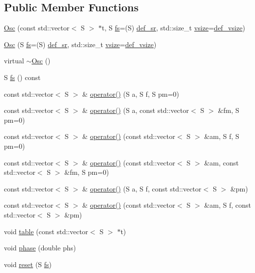 \subsection*{Public Member Functions}
\begin{DoxyCompactItemize}
\item 
\hyperlink{class_aurora_1_1_osc_aa0ff8c343d8e8c0503ed00445d504348}{Osc} (const std\+::vector$<$ S $>$ $\ast$t, S \hyperlink{class_aurora_1_1_osc_a10d968f92bf489112dd990c15cda6780}{fs}=(S) \hyperlink{namespace_aurora_ad49263d809bea98dd422e95bc91bc03e}{def\+\_\+sr}, std\+::size\+\_\+t \hyperlink{class_aurora_1_1_snd_base_af9e21aaf411b17f7a8221c991ce5d291}{vsize}=\hyperlink{namespace_aurora_afaaddf667a06e7ce23c667a8b7295263}{def\+\_\+vsize})
\item 
\hyperlink{class_aurora_1_1_osc_a696356c8638245c8c924adc2bfdc1d0e}{Osc} (S \hyperlink{class_aurora_1_1_osc_a10d968f92bf489112dd990c15cda6780}{fs}=(S) \hyperlink{namespace_aurora_ad49263d809bea98dd422e95bc91bc03e}{def\+\_\+sr}, std\+::size\+\_\+t \hyperlink{class_aurora_1_1_snd_base_af9e21aaf411b17f7a8221c991ce5d291}{vsize}=\hyperlink{namespace_aurora_afaaddf667a06e7ce23c667a8b7295263}{def\+\_\+vsize})
\item 
virtual \hyperlink{class_aurora_1_1_osc_a1c8857130cdc3f61acd835d3725df831}{$\sim$\+Osc} ()
\item 
S \hyperlink{class_aurora_1_1_osc_a10d968f92bf489112dd990c15cda6780}{fs} () const
\item 
const std\+::vector$<$ S $>$ \& \hyperlink{class_aurora_1_1_osc_ad12b79aacefcfb108419b03bbeb54d8c}{operator()} (S a, S f, S pm=0)
\item 
const std\+::vector$<$ S $>$ \& \hyperlink{class_aurora_1_1_osc_a706ce9f09193a510060a7bc6e0c44142}{operator()} (S a, const std\+::vector$<$ S $>$ \&fm, S pm=0)
\item 
const std\+::vector$<$ S $>$ \& \hyperlink{class_aurora_1_1_osc_ad5d820889253afd837b103843d2fd7ad}{operator()} (const std\+::vector$<$ S $>$ \&am, S f, S pm=0)
\item 
const std\+::vector$<$ S $>$ \& \hyperlink{class_aurora_1_1_osc_a7949e8ffffb3a32ca12028e317fcb483}{operator()} (const std\+::vector$<$ S $>$ \&am, const std\+::vector$<$ S $>$ \&fm, S pm=0)
\item 
const std\+::vector$<$ S $>$ \& \hyperlink{class_aurora_1_1_osc_abbef8b0aacfbc3cac66f25b774bd3a84}{operator()} (S a, S f, const std\+::vector$<$ S $>$ \&pm)
\item 
const std\+::vector$<$ S $>$ \& \hyperlink{class_aurora_1_1_osc_a6a339a71db41fbbd944dd603c986b81d}{operator()} (const std\+::vector$<$ S $>$ \&am, S f, const std\+::vector$<$ S $>$ \&pm)
\item 
void \hyperlink{class_aurora_1_1_osc_af003fa84004e878179446ceaf2d0007c}{table} (const std\+::vector$<$ S $>$ $\ast$t)
\item 
void \hyperlink{class_aurora_1_1_osc_a93770f94cde427c999be8a7b6c8a1cc9}{phase} (double phs)
\item 
void \hyperlink{class_aurora_1_1_osc_a9537710c678ff70707c340343534ac58}{reset} (S \hyperlink{class_aurora_1_1_osc_a10d968f92bf489112dd990c15cda6780}{fs})
\end{DoxyCompactItemize}


